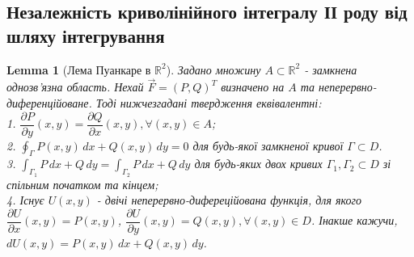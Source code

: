 \documentclass[a4paper, 10pt]{article}
\def\departial#1#2{\dfrac{\partial {#1}}{\partial {#2}}}
\theoremstyle{theoremdd}
\theoremstyle{theoremdd}
\theoremstyle{theoremdd}
\theoremstyle{theoremdd}
\theoremstyle{theoremdd}
\theoremstyle{theoremdd}
\theoremstyle{theoremdd}
\newtheorem{lemma}[theorem]{Lemma}
\theoremstyle{theoremdd}
\begin{document}
\subsection{Незалежність криволінійного інтегралу ІІ роду від шляху інтегрування}
\begin{lemma}[Лема Пуанкаре в $\mathbb{R}^2$]
Задано множину $A \subset \mathbb{R}^2$ - замкнена однозв'язна область. Нехай $\vec{F} = (P,Q)^T$ визначено на $A$ та неперервно-диференційоване. Тоді нижчезгадані твердження еквівалентні:\\
1. $\departial{P}{y}(x,y) = \departial{Q}{x}(x,y), \forall (x,y) \in A$;\\
2. $\displaystyle\oint_{\Gamma} P(x,y)\,dx + Q(x,y)\,dy = 0$ для будь-якої замкненої кривої $\Gamma \subset D$.\\
3. $\displaystyle\int_{\Gamma_1} P\,dx + Q\,dy = \int_{\Gamma_2} P\,dx + Q\,dy$ для будь-яких двох кривих $\Gamma_1, \Gamma_2 \subset D$ зі спільним початком та кінцем;\\
4. Існує $U(x,y)$ - двічі неперервно-дифереційована функція, для якого $\departial{U}{x}(x,y) = P(x,y)$, $\departial{U}{y}(x,y) = Q(x,y), \forall (x,y) \in D$. Інакше кажучи, $dU(x,y) =  P(x,y)\,dx + Q(x,y)\,dy$.
\end{lemma}
\end{document}
